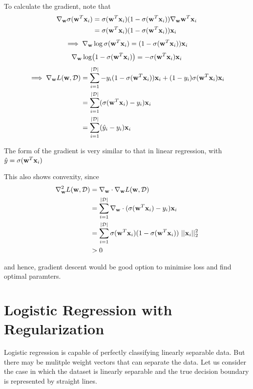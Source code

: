 To calculate the gradient, note that \begin{align*}
  \nabla_{\textbf{w}} \sigma(\textbf{w}^T \textbf{x}_i) & =  \sigma(\textbf{w}^T \textbf{x}_i)(1-\sigma(\textbf{w}^T \textbf{x}_i))\nabla_{\textbf{w}} \textbf{w}^T \textbf{x}_i \\ &= \sigma(\textbf{w}^T \textbf{x}_i)(1-\sigma(\textbf{w}^T \textbf{x}_i))\textbf{x}_i
\end{align*}
$$
  \implies \nabla_{\textbf{w}} \log \sigma(\textbf{w}^T \textbf{x}_i) = (1-\sigma(\textbf{w}^T \textbf{x}_i))\textbf{x}_i
$$
$$
  \nabla_{\textbf{w}} \log (1 - \sigma(\textbf{w}^T \textbf{x}_i)) = -\sigma(\textbf{w}^T \textbf{x}_i)\textbf{x}_i
$$
\begin{align*}
  \implies \nabla_{\textbf{w}}L  (\textbf{w},  \mathcal{D}) & =  \sum_{i = 1}^{| \mathcal{D}|}-y_i  (1-\sigma(\textbf{w}^T \textbf{x}_i))\textbf{x}_i + (1 - y_i) \sigma(\textbf{w}^T \textbf{x}_i)\textbf{x}_i \\&= \sum_{i = 1}^{| \mathcal{D}|}(\sigma(\textbf{w}^T\textbf{x}_i)-y_i) \textbf{x}_i\\
                                           & = \sum_{i = 1}^{| \mathcal{D}|}(\hat y_i-y_i) \textbf{x}_i
\end{align*}

The form of the gradient is very similar to that in linear regression, with $\hat y = \sigma(\textbf{w}^T\textbf{x}_i)$

This also shows convexity, since
\begin{align*}
  \nabla^2_{\tc{w}}L  (\tc{w},  \D) & = \nabla_{\tc{w}} \cdot \nabla_{\tc{w}} L (\tc{w},  \D)                                         \\
                                    & = \sum_{i = 1}^{|\D|} \nabla_{\tc{w}} \cdot (\sigma(\tc{w}^T\tc{x}_i)-y_i) \tc{x}_i             \\
                                    & = \sum_{i = 1}^{|\D|} \sigma(\tc{w}^T \tc{x}_i)(1-\sigma(\tc{w}^T \tc{x}_i)) \ ||\tc{x}_i||_2^2 \\
                                    & > 0
\end{align*}

and hence, gradient descent would be good option to minimise loss and find optimal paramters.

\section{Logistic Regression with Regularization}

Logistic regression is capable of perfectly classifying linearly separable data. But there may be mulitple weight vectors that can separate the data. Let us consider the case in which the dataset is linearly separable and the true decision boundary is represented by straight lines.

